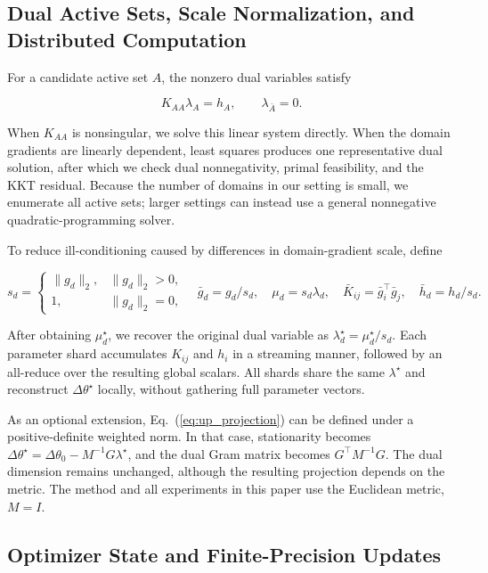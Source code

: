 \documentclass{article}
\begin{document}
\subsection{Dual Active Sets, Scale Normalization, and Distributed Computation}
\label{app:dual_solver}

For a candidate active set $A$, the nonzero dual variables satisfy

\[
K_{AA}\lambda_A=h_A,\qquad \lambda_{\bar A}=0.
\tag{C.2}
\]

When $K_{AA}$ is nonsingular, we solve this linear system directly. When the domain gradients are linearly dependent, least squares produces one representative dual solution, after which we check dual nonnegativity, primal feasibility, and the KKT residual. Because the number of domains in our setting is small, we enumerate all active sets; larger settings can instead use a general nonnegative quadratic-programming solver.

To reduce ill-conditioning caused by differences in domain-gradient scale, define

\[
s_d=\begin{cases}\|g_d\|_2,&\|g_d\|_2>0,\\1,&\|g_d\|_2=0,\end{cases}
\quad
\bar g_d=g_d/s_d,\quad
\mu_d=s_d\lambda_d,\quad
\bar K_{ij}=\bar g_i^\top\bar g_j,\quad
\bar h_d=h_d/s_d.
\tag{C.3}
\]

After obtaining $\mu_d^\star$, we recover the original dual variable as $\lambda_d^\star=\mu_d^\star/s_d$. Each parameter shard accumulates $K_{ij}$ and $h_i$ in a streaming manner, followed by an all-reduce over the resulting global scalars. All shards share the same $\lambda^\star$ and reconstruct $\Delta\theta^\star$ locally, without gathering full parameter vectors.

As an optional extension, Eq.~(\ref{eq:up_projection}) can be defined under a positive-definite weighted norm. In that case, stationarity becomes $\Delta\theta^\star=\Delta\theta_0-M^{-1}G\lambda^\star$, and the dual Gram matrix becomes $G^\top M^{-1}G$. The dual dimension remains unchanged, although the resulting projection depends on the metric. The method and all experiments in this paper use the Euclidean metric, $M=I$.

\subsection{Optimizer State and Finite-Precision Updates}
\label{app:finite_precision}
\end{document}
